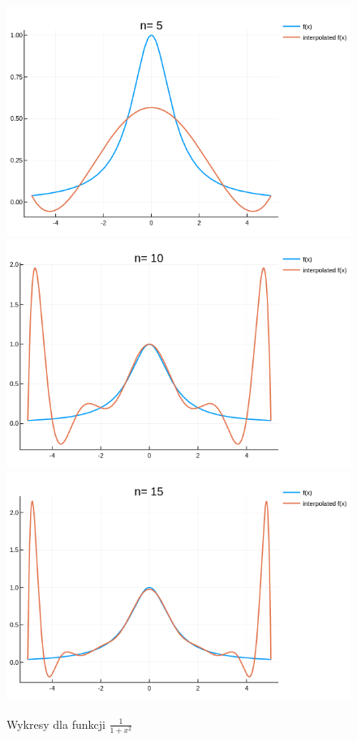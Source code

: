\documentclass[12pt, a4paper]{article}
\begin{document}
\newpage

\begin{figure}[h]
    \centering
    \includegraphics[scale=0.35]{../plots/ex6/4.png}
    \includegraphics[scale=0.35]{../plots/ex6/6.png}
    \includegraphics[scale=0.35]{../plots/ex6/5.png}    
    \caption{Wykresy dla funkcji $\frac{1}{1+x^2}$}
\end{figure}
\end{document}
